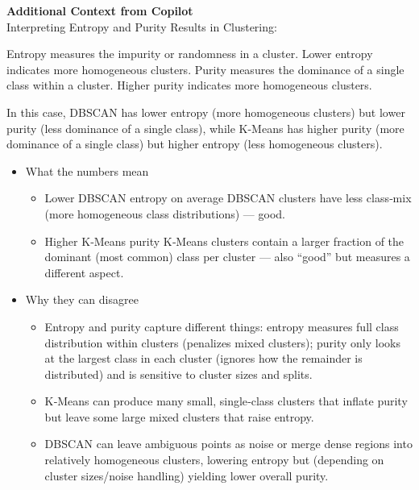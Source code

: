 \begin{framed}
\textbf{Additional Context from Copilot}\\
Interpreting Entropy and Purity Results in Clustering:

Entropy measures the impurity or randomness in a cluster. Lower entropy indicates more homogeneous clusters.
Purity measures the dominance of a single class within a cluster. Higher purity indicates more homogeneous clusters.

In this case, DBSCAN has lower entropy (more homogeneous clusters) but lower purity (less dominance of a single class), while K-Means has higher purity (more dominance of a single class) but higher entropy (less homogeneous clusters).

\begin{itemize}
\item What the numbers mean

\begin{itemize}
\item Lower DBSCAN entropy \rightarrow on average DBSCAN clusters have less class‑mix (more homogeneous class distributions) --- good.
\item Higher K‑Means purity \rightarrow K‑Means clusters contain a larger fraction of the dominant (most common) class per cluster --- also ``good'' but measures a different aspect.
\end{itemize}


\item Why they can disagree

\begin{itemize}
\item Entropy and purity capture different things: entropy measures full class distribution within clusters (penalizes mixed clusters); purity only looks at the largest class in each cluster (ignores how the remainder is distributed) and is sensitive to cluster sizes and splits.
\item K‑Means can produce many small, single‑class clusters that inflate purity but leave some large mixed clusters that raise entropy.
\item DBSCAN can leave ambiguous points as noise or merge dense regions into relatively homogeneous clusters, lowering entropy but (depending on cluster sizes/noise handling) yielding lower overall purity.
\end{itemize}
\end{itemize}
\end{framed}

